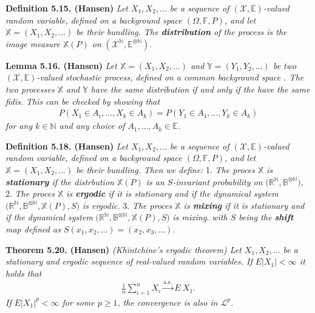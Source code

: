 \documentclass[a4paper,12pt,openany]{book}
\begin{document}
\textbf{Definition 5.15. (Hansen)} \emph{Let \(X_1,X_2,...\) be a sequence of \((\mathcal{X},\mathbb{E})\)-valued random variable, defined on a background space \((\Omega,\mathbb{F},P)\), and let \(\mathbb{X}=(X_1,X_2,...)\) be their bundling. The \textbf{distribution} of the process is the image measure \(\mathbb{X}(P)\) on} \((\mathcal{X}^{\mathbb{N}},{\mathbb{E}}^{\otimes \mathbb{N}})\).

\textbf{Lemma 5.16. (Hansen)} \emph{Let \(\mathbb{X}=(X_1,X_2,...)\) and \(\mathbb{Y}=(Y_1,Y_2,...)\) be two \((\mathcal{X},\mathbb{E})\)-valued stochastic process, defined on a common background space . The two processes \(\mathbb{X}\) and \(\mathbb{Y}\) have the same distribution if and only if the have the same fidis.}
\emph{This can be checked by showing that}
\begin{align*}
    P(X_1\in A_i,...,X_k\in A_k)=P(Y_1\in A_1,...,Y_k\in A_k)\tag{5.25}
\end{align*}
\emph{for any \(k\in\mathbb{N}\) and any choice of \(A_1,...,A_k\in\mathbb{E}\).}

\textbf{Definition 5.18. (Hansen)} \emph{Let \(X_1,X_2,...\) be a sequence of \((\mathcal{X},\mathbb{E})\)-valued random variable, defined on a background space \((\Omega,\mathbb{F},P)\), and let \(\mathbb{X}=(X_1,X_2,...)\) be their bundling. Then we define:}
1. \emph{The proces \(\mathbb{X}\) is \textbf{stationary} if the distrbution \(\mathbb{X}(P)\) is an \(S\)-invariant probability on} \(\Big(\mathbb{R}^{\mathbb{N}},\mathbb{B}^{\otimes \mathbb{N}}\Big)\),
2. \emph{The proces \(\mathbb{X}\) is \textbf{ergodic} if it is stationary and if the dynamical system} \(\Big(\mathbb{R}^{\mathbb{N}},\mathbb{B}^{\otimes \mathbb{N}},\mathbb{X}(P),S\Big)\) \emph{is ergodic.}
3. \emph{The proces \(\mathbb{X}\) is \textbf{mixing} if it is stationary and if the dynamical system} \(\Big(\mathbb{R}^{\mathbb{N}},\mathbb{B}^{\otimes \mathbb{N}},\mathbb{X}(P),S\Big)\) \emph{is mixing.}
\emph{with \(S\) being the \textbf{shift} map defined as \(S(x_1,x_2,...)=(x_2,x_3,...)\).}

\textbf{Theorem 5.20. (Hansen)} \emph{(Khintchine's ergodic theorem) Let \(X_1,X_2,...\) be a stationary and ergodic sequence of real-valued random variables. If \(E\vert X_1\vert <\infty\) it holds that}
\begin{align*}
    \frac{1}{n}\sum_{i=1}^nX_i\stackrel{\text{a.s.}}{\to} E\ X_1.\tag{5.27}
\end{align*}
\emph{If \(E\vert X_1\vert ^p<\infty\) for some \(p\ge 1\), the convergence is also in \(\mathcal{L}^p\).}
\end{document}
